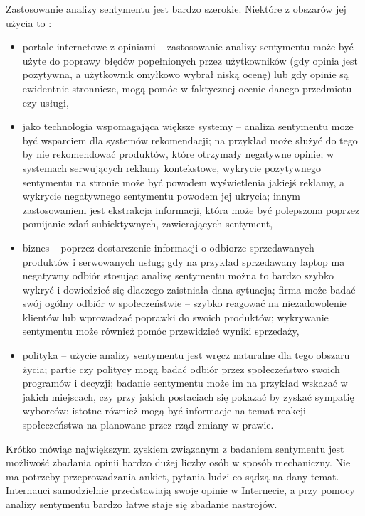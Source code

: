 Zastosowanie analizy sentymentu jest bardzo szerokie. Niektóre
z obszarów jej użycia to \cite{pangLeeApplication}:
\begin{itemize}
  \item portale internetowe z opiniami -- zastosowanie analizy sentymentu
może być użyte do poprawy błędów popełnionych przez użytkowników (gdy opinia
jest pozytywna, a użytkownik omyłkowo wybrał niską ocenę) lub gdy opinie
są ewidentnie stronnicze, mogą pomóc w faktycznej ocenie danego przedmiotu czy 
usługi,

\item jako technologia wspomagająca większe systemy -- analiza sentymentu może
być wsparciem dla systemów rekomendacji; na przykład może służyć do 
tego by nie rekomendować produktów, które otrzymały negatywne opinie; 
w systemach serwujących reklamy kontekstowe, wykrycie pozytywnego sentymentu
na stronie może być powodem wyświetlenia jakiejś reklamy,
a wykrycie negatywnego sentymentu powodem jej ukrycia;
innym zastosowaniem jest ekstrakcja informacji, która może być
polepszona poprzez pomijanie zdań subiektywnych, zawierających sentyment,

\item biznes -- poprzez dostarczenie informacji o odbiorze sprzedawanych produktów
i serwowanych usług; gdy na przykład sprzedawany laptop ma negatywny odbiór
stosując analizę sentymentu można to bardzo szybko wykryć i dowiedzieć się
dlaczego zaistniała dana sytuacja; firma może badać swój ogólny odbiór
w społeczeństwie -- szybko reagować na niezadowolenie klientów lub wprowadzać
poprawki do swoich produktów; wykrywanie sentymentu może również pomóc
przewidzieć wyniki sprzedaży,

\item polityka -- użycie analizy sentymentu jest wręcz naturalne dla tego
obszaru życia; partie czy politycy mogą badać odbiór przez społeczeństwo swoich
programów i decyzji; badanie sentymentu może im na przykład wskazać w jakich
miejscach, czy przy jakich postaciach się pokazać by zyskać sympatię wyborców;
istotne również mogą być informacje na temat reakcji społeczeństwa na planowane
przez rząd zmiany w prawie.
\end{itemize}

Krótko mówiąc największym zyskiem związanym z badaniem sentymentu jest możliwość
zbadania opinii bardzo dużej liczby osób w sposób mechaniczny. Nie ma potrzeby
przeprowadzania ankiet, pytania ludzi co sądzą na dany temat. Internauci samodzielnie
przedstawiają swoje opinie w Internecie, a przy pomocy analizy sentymentu bardzo
łatwe staje się zbadanie nastrojów.

